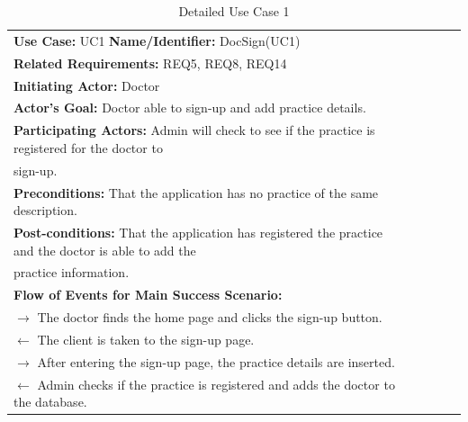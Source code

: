\documentclass[a4paper]{article}
\begin{document}
\begin{table}[h!]
\centering
\caption*{Detailed Use Case 1}
\label{DetailedUC1}
\begin{tabular}{|c|llll}
\cline{1-1}
\multicolumn{1}{|l|}{\textbf{Use Case:} UC1 \textbf{Name/Identifier:} DocSign(UC1)} &  &  &  &  \\ \cline{1-1}

\multicolumn{1}{|l|}{\textbf{Related Requirements:} REQ5, REQ8, REQ14} &  &  &  &  \\

\multicolumn{1}{|l|}{\textbf{Initiating Actor:} Doctor} &  &  &  &  \\

\multicolumn{1}{|l|}{\textbf{Actor’s Goal:} Doctor able to sign-up and add practice details.} &  &  &  &  \\

\multicolumn{1}{|l|}{\textbf{Participating Actors:} Admin will check to see if the practice is registered for the doctor to} &  &  &  &  \\

\multicolumn{1}{|l|}{sign-up.} &  &  &  &  \\

\multicolumn{1}{|l|}{\textbf{Preconditions:} That the application has no practice of the same description.} &  &  &  &  \\

\multicolumn{1}{|l|}{\textbf{Post-conditions:} That the application has registered the practice and the doctor is able to add the} &  &  &  &  \\

\multicolumn{1}{|l|}{practice information.} &  &  &  &  \\

\multicolumn{1}{|l|}{\textbf{Flow of Events for Main Success Scenario:}} &  &  &  &  \\

\multicolumn{1}{|l|}{ $ \rightarrow $ The doctor finds the home page and clicks the sign-up button.} &  &  &  &  \\

\multicolumn{1}{|l|}{ $ \leftarrow $ The client is taken to the sign-up page.} &  &  &  &  \\

\multicolumn{1}{|l|}{ $ \rightarrow $ After entering the sign-up page, the practice details are inserted.} &  &  &  &  \\

\multicolumn{1}{|l|}{ $ \leftarrow $ Admin checks if the practice is registered and adds the doctor to the database.} &  &  &  &  \\


\end{tabular}
\end{table}
\end{document}
